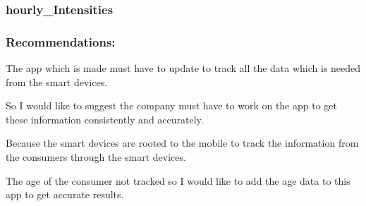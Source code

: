 \documentclass[
]{article}
\newenvironment{Shaded}{\begin{snugshade}}{\end{snugshade}}
\newcommand{\AttributeTok}[1]{\textcolor[rgb]{0.77,0.63,0.00}{#1}}
\newcommand{\FunctionTok}[1]{\textcolor[rgb]{0.00,0.00,0.00}{#1}}
\newcommand{\NormalTok}[1]{#1}
\newcommand{\OtherTok}[1]{\textcolor[rgb]{0.56,0.35,0.01}{#1}}
\newcommand{\SpecialCharTok}[1]{\textcolor[rgb]{0.00,0.00,0.00}{#1}}
\newcommand{\StringTok}[1]{\textcolor[rgb]{0.31,0.60,0.02}{#1}}
\begin{document}
\begin{Shaded}
\end{Shaded}

\hypertarget{hourly_intensities}{%
\subsubsection{hourly\_Intensities}\label{hourly_intensities}}

\begin{Shaded}
\end{Shaded}

\hypertarget{recommendations-1}{%
\subsubsection{Recommendations:}\label{recommendations-1}}

The app which is made must have to update to track all the data which is
needed from the smart devices.

So I would like to suggest the company must have to work on the app to
get these information consistently and accurately.

Because the smart devices are rooted to the mobile to track the
information from the consumers through the smart devices.

The age of the consumer not tracked so I would like to add the age data
to this app to get accurate results.
\end{document}
